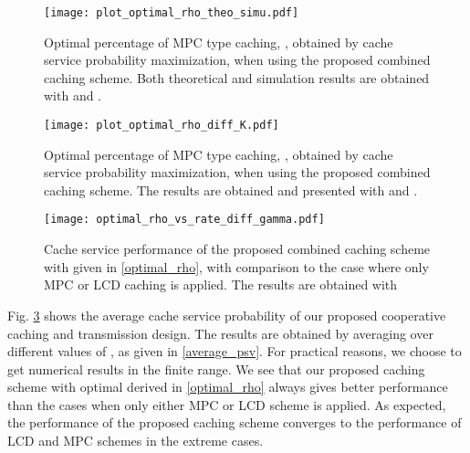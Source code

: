 \documentclass[twocolumns,10pt]{IEEEtran}
\begin{document}
\begin{figure}
	\centering
	\texttt{[image: plot\_optimal\_rho\_theo\_simu.pdf]}
	\caption{Optimal percentage of MPC type caching, , obtained by cache service probability maximization, when using the proposed combined caching scheme. Both theoretical and simulation results are obtained with  and .}
	\label{optimal_rho_vs_rate}
\end{figure}

\begin{figure}
	\centering
	\texttt{[image: plot\_optimal\_rho\_diff\_K.pdf]}
	\caption{Optimal percentage of MPC type caching, , obtained by cache service probability maximization, when using the proposed combined caching scheme. The results are obtained and presented with  and .}
	\label{optimal_rho_diff_K}
\end{figure}

\begin{figure}
	\centering
	\texttt{[image: optimal\_rho\_vs\_rate\_diff\_gamma.pdf]}
	\caption{Cache service performance of the proposed combined caching scheme with  given in \eqref{optimal_rho}, with comparison to the case where only MPC or LCD caching is applied. The results are obtained with  }
	\label{optimal_rho_K3_R100}
\end{figure}

Fig. \ref{optimal_rho_K3_R100} shows the average cache service probability of our proposed cooperative caching and transmission design. The results are obtained by averaging over different values of , as given in \eqref{average_psv}. For practical reasons, we choose  to get numerical results in the finite range. We see that our proposed caching scheme with optimal  derived in \eqref{optimal_rho} always gives better performance than the cases when only either MPC or LCD scheme is applied. As expected, the performance of the proposed caching scheme converges to the performance of LCD and MPC schemes in the extreme cases. 
\end{document}
